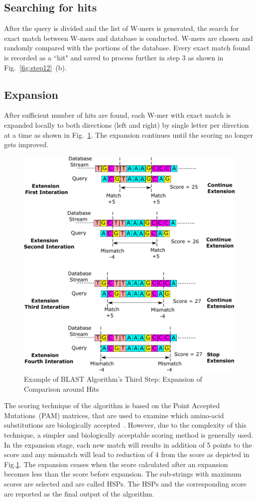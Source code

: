 \subsection{Searching for hits}
After the query is divided and the list of W-mers is generated, the search for exact match between W-mers and database is conducted.
W-mers are chosen and randomly compared with the portions of the database. 
Every exact match found is recorded as a ``hit" and saved to process further in step 3 as shown in Fig.~\ref{fig:step12}~(b). 


\subsection{Expansion}
After sufficient number of hits are found, each W-mer with exact match is expanded locally to both directions (left and right) by single letter per direction at a time as shown in Fig.~\ref{fig:step3}. 
The expansion continues until the scoring no longer gets improved.
\begin{figure}[t!]
\centering
\includegraphics[width=\columnwidth]{Figures/Algorithm3.pdf}
\caption{Example of BLAST Algorithm's Third Step: Expansion of Comparison around Hits} 
\label{fig:step3}
\end{figure}
The scoring technique of the algorithm is based on the Point Accepted Mutations~(PAM) matrices, that are used to examine which amino-acid substitutions are biologically accepted~\cite{sotiriades2007design}. 
However, due to the complexity of this technique, a simpler and biologically acceptable scoring method is generally used. 
In the expansion stage, each new match will results in addition of 5 points to the score and any mismatch will lead to reduction of 4 from the score as depicted in Fig.\ref{fig:step3}.
The expansion ceases when the score calculated after an expansion becomes less than the score before expansion.
The sub-strings with maximum scores are selected and are called HSPs.
The HSPs and the corresponding score are reported as the final output of the algorithm.

